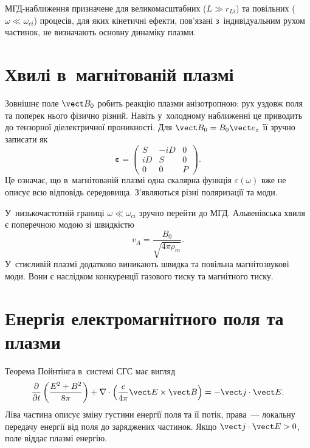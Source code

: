 МГД-наближення призначене для великомасштабних ($L\gg r_{Li}$) та повільних
($\omega\ll\omega_{ci}$) процесів, для яких кінетичні ефекти, пов'язані з~індивідуальним
рухом частинок, не визначають основну динаміку плазми.




\section{Хвилі в~магнітованій плазмі}



Зовнішнє поле $\vect B_0$ робить реакцію плазми анізотропною: рух уздовж поля та поперек
нього фізично різний. Навіть у~холодному наближенні це приводить до тензорної
діелектричної проникності. Для $\vect B_0=B_0\vect e_z$ її зручно записати як
\begin{equation}\label{eq:magnetized-dielectric-tensor}
\boldsymbol{\varepsilon}=
\begin{pmatrix}S&-iD&0\\ iD&S&0\\0&0&P\end{pmatrix}.
\end{equation}
Це означає, що в~магнітованій плазмі одна скалярна функція $\varepsilon(\omega)$ вже не
описує всю відповідь середовища. З'являються різні поляризації та моди.

У~низькочастотній границі $\omega\ll\omega_{ci}$ зручно перейти до МГД. Альвенівська хвиля
є поперечною модою зі швидкістю
\begin{equation*}
v_A=\frac{B_0}{\sqrt{4\pi\rho_m}}.
\end{equation*}
У~стисливій плазмі додатково виникають швидка та повільна магнітозвукові моди. Вони є
наслідком конкуренції газового тиску та магнітного тиску.



\section{Енергія електромагнітного поля та плазми}



Теорема Пойнтінга в~системі СГС має вигляд
\begin{equation}\label{eq:poynting-theorem-plasma}
\frac{\partial}{\partial t}\left(\frac{E^2+B^2}{8\pi}\right)
+\nabla\cdot\left(\frac{c}{4\pi}\vect E\times\vect B\right)
=-\vect j\cdot\vect E.
\end{equation}
Ліва частина описує зміну густини енергії поля та її потік, права~--- локальну передачу
енергії від поля до заряджених частинок. Якщо $\vect j\cdot\vect E>0$, поле віддає плазмі
енергію.

